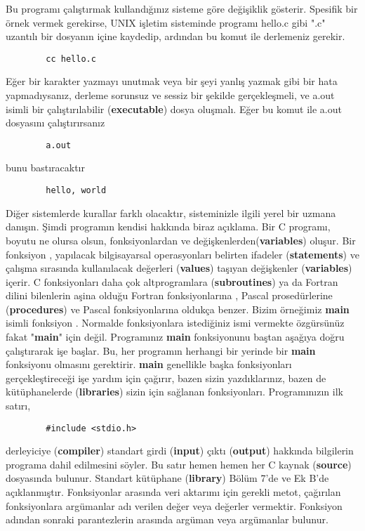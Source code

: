 \documentclass[a4paper,12pt,oneside]{book}
\begin{document}
Bu programı çalıştırmak kullandığınız sisteme göre değişiklik gösterir. Spesifik bir örnek vermek gerekirse, UNIX işletim sisteminde programı hello.c gibi ".c" uzantılı bir dosyanın içine kaydedip, ardından bu komut ile derlemeniz gerekir.
\begin{lstlisting}
		cc hello.c
\end{lstlisting}
Eğer bir karakter yazmayı unutmak veya bir şeyi yanlış yazmak gibi bir hata yapmadıysanız, derleme sorunsuz ve sessiz bir şekilde gerçekleşmeli, ve a.out isimli bir çalıştırılabilir (\textbf{executable}) dosya oluşmalı. Eğer bu komut ile a.out dosyasını çalıştırırsanız
\begin{lstlisting}
		a.out
\end{lstlisting}
bunu bastıracaktır
\begin{lstlisting}
		hello, world
\end{lstlisting}

Diğer sistemlerde kurallar farklı olacaktır, sisteminizle ilgili yerel bir uzmana danışın.
Şimdi programın kendisi hakkında biraz açıklama. Bir C programı, boyutu ne olursa olsun, fonksiyonlardan ve değişkenlerden(\textbf{variables}) oluşur. Bir fonksiyon , yapılacak bilgisayarsal operasyonları belirten ifadeler (\textbf{statements}) ve çalışma sırasında kullanılacak değerleri (\textbf{values}) taşıyan değişkenler (\textbf{variables}) içerir. C fonksiyonları  daha çok altprogramlara (\textbf{subroutines}) ya da Fortran dilini bilenlerin aşina olduğu Fortran fonksiyonlarına , Pascal prosedürlerine (\textbf{procedures}) ve Pascal fonksiyonlarına  oldukça benzer. Bizim örneğimiz \textbf{main} isimli fonksiyon . Normalde fonksiyonlara  istediğiniz ismi vermekte özgürsünüz fakat "\textbf{main}" için değil. Programınız \textbf{main} fonksiyonunu  baştan aşağıya doğru çalıştırarak işe başlar. Bu, her programın herhangi bir yerinde bir \textbf{main} fonksiyonu  olmasını gerektirir.
\textbf{main} genellikle başka fonksiyonları  gerçekleştireceği işe yardım için çağırır, bazen sizin yazdıklarınız, bazen de kütüphanelerde (\textbf{libraries}) sizin için sağlanan fonksiyonları. Programınızın ilk satırı,
\begin{lstlisting}
		#include <stdio.h>
\end{lstlisting}
derleyiciye (\textbf{compiler}) standart girdi (\textbf{input}) çıktı (\textbf{output}) hakkında bilgilerin programa dahil edilmesini söyler. Bu satır hemen hemen her C kaynak (\textbf{source}) dosyasında bulunur. Standart kütüphane (\textbf{library}) Bölüm 7'de ve Ek B'de açıklanmıştır.
Fonksiyonlar  arasında veri aktarımı için gerekli metot, çağırılan fonksiyonlara  argümanlar  adı verilen değer veya değerler vermektir. Fonksiyon adından sonraki parantezlerin arasında argüman  veya argümanlar  bulunur. \\
\end{document}
